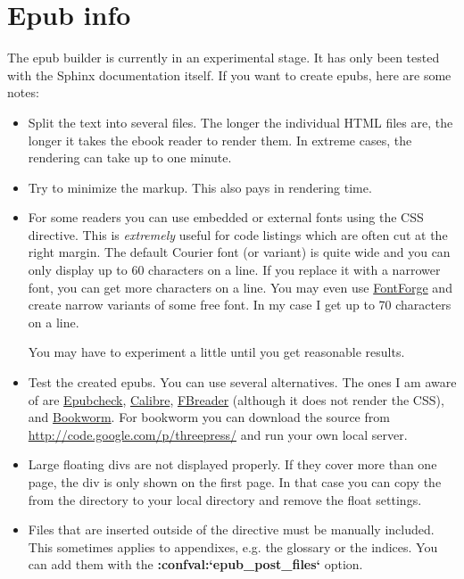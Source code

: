 \documentclass[letterpaper,10pt,english]{sphinxmanual}
\begin{document}
\section{Epub info}
\label{faq:epub-info}\label{faq:epub-faq}
The epub builder is currently in an experimental stage.  It has only been tested
with the Sphinx documentation itself.  If you want to create epubs, here are
some notes:
\begin{itemize}
\item {} 
Split the text into several files. The longer the individual HTML files are,
the longer it takes the ebook reader to render them.  In extreme cases, the
rendering can take up to one minute.

\item {} 
Try to minimize the markup.  This also pays in rendering time.

\item {} 
For some readers you can use embedded or external fonts using the CSS
 directive.  This is \emph{extremely} useful for code listings which
are often cut at the right margin.  The default Courier font (or variant) is
quite wide and you can only display up to 60 characters on a line.  If you
replace it with a narrower font, you can get more characters on a line.  You
may even use \href{http://fontforge.sourceforge.net/}{FontForge} and create
narrow variants of some free font.  In my case I get up to 70 characters on a
line.

You may have to experiment a little until you get reasonable results.

\item {} 
Test the created epubs. You can use several alternatives.  The ones I am aware
of are \href{http://code.google.com/p/epubcheck/}{Epubcheck}, \href{http://calibre-ebook.com/}{Calibre}, \href{http://www.fbreader.org/}{FBreader} (although it does not render the CSS),
and \href{http://bookworm.oreilly.com/}{Bookworm}.  For bookworm you can download the source from
\url{http://code.google.com/p/threepress/} and run your own local server.

\item {} 
Large floating divs are not displayed properly.
If they cover more than one page, the div is only shown on the first page.
In that case you can copy the  from the
 directory to your local 
directory and remove the float settings.

\item {} 
Files that are inserted outside of the  directive must be manually
included. This sometimes applies to appendixes, e.g. the glossary or
the indices.  You can add them with the {\color{red}\bfseries{}:confval:{}`epub\_post\_files{}`} option.

\end{itemize}
\end{document}
